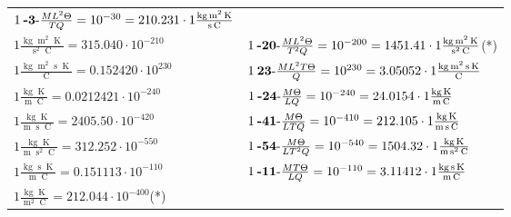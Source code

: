 \begin{center}
\begin{longtable}{l l}
	{\color{black}$1\:\text{\textbf{-3}-} \frac{ML^2\Theta}{TQ}=10^{-30} = 210.231 \cdot 1 \bm{\mathrm{ }}\frac{\operatorname{kg}\operatorname{m}^2\operatorname{K}}{\operatorname{s}\operatorname{C}}$}\\
{\color{black}$1 \bm{\mathrm{ }}\frac{\operatorname{kg}\operatorname{m}^2\operatorname{K}}{\operatorname{s}^2\operatorname{C}} = 315.040\cdot10^{-210} $}&
	{\color{black}$1\:\text{\textbf{-20}-} \frac{ML^2\Theta}{T^2Q}=10^{-200} = 1451.41 \cdot 1 \bm{\mathrm{ }}\frac{\operatorname{kg}\operatorname{m}^2\operatorname{K}}{\operatorname{s}^2\operatorname{C}}$}\quad(*)\\
{\color{black}$1 \bm{\mathrm{ }}\frac{\operatorname{kg}\operatorname{m}^2\operatorname{s}\operatorname{K}}{\operatorname{C}} = 0.152420\cdot10^{230} $}&
	{\color{black}$1\:\text{\textbf{23}-} \frac{ML^2T\Theta}{Q}=10^{230} = 3.05052 \cdot 1 \bm{\mathrm{ }}\frac{\operatorname{kg}\operatorname{m}^2\operatorname{s}\operatorname{K}}{\operatorname{C}}$}\\
{\color{black}$1 \bm{\mathrm{ }}\frac{\operatorname{kg}\operatorname{K}}{\operatorname{m}\operatorname{C}} = 0.0212421\cdot10^{-240} $}&
	{\color{black}$1\:\text{\textbf{-24}-} \frac{M\Theta}{LQ}=10^{-240} = 24.0154 \cdot 1 \bm{\mathrm{ }}\frac{\operatorname{kg}\operatorname{K}}{\operatorname{m}\operatorname{C}}$}\\
{\color{black}$1 \bm{\mathrm{ }}\frac{\operatorname{kg}\operatorname{K}}{\operatorname{m}\operatorname{s}\operatorname{C}} = 2405.50\cdot10^{-420} $}&
	{\color{black}$1\:\text{\textbf{-41}-} \frac{M\Theta}{LTQ}=10^{-410} = 212.105 \cdot 1 \bm{\mathrm{ }}\frac{\operatorname{kg}\operatorname{K}}{\operatorname{m}\operatorname{s}\operatorname{C}}$}\\
{\color{black}$1 \bm{\mathrm{ }}\frac{\operatorname{kg}\operatorname{K}}{\operatorname{m}\operatorname{s}^2\operatorname{C}} = 312.252\cdot10^{-550} $}&
	{\color{black}$1\:\text{\textbf{-54}-} \frac{M\Theta}{LT^2Q}=10^{-540} = 1504.32 \cdot 1 \bm{\mathrm{ }}\frac{\operatorname{kg}\operatorname{K}}{\operatorname{m}\operatorname{s}^2\operatorname{C}}$}\\
{\color{black}$1 \bm{\mathrm{ }}\frac{\operatorname{kg}\operatorname{s}\operatorname{K}}{\operatorname{m}\operatorname{C}} = 0.151113\cdot10^{-110} $}&
	{\color{black}$1\:\text{\textbf{-11}-} \frac{MT\Theta}{LQ}=10^{-110} = 3.11412 \cdot 1 \bm{\mathrm{ }}\frac{\operatorname{kg}\operatorname{s}\operatorname{K}}{\operatorname{m}\operatorname{C}}$}\\
{\color{black}$1 \bm{\mathrm{ }}\frac{\operatorname{kg}\operatorname{K}}{\operatorname{m}^2\operatorname{C}} = 212.044\cdot10^{-400} $}\quad(*)&

\end{longtable}
\end{center}
